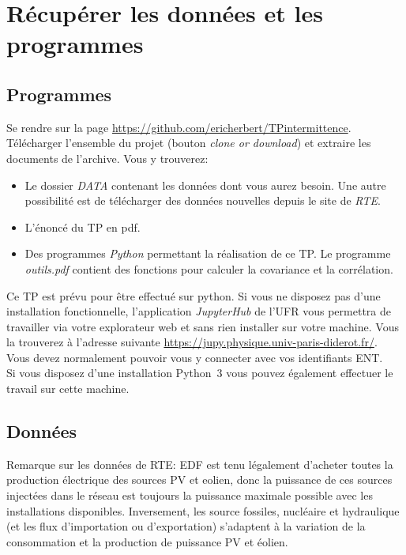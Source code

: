 \documentclass[12pt,a4,french]{article}
\newcommand{\tmtextit}[1]{{\itshape{#1}}}
\begin{document}
\section{Récupérer les données et les programmes}

\subsection{Programmes}

Se rendre sur la page
\href{https://github.com/ericherbert/TPintermittence}{https://github.com/ericherbert/TPintermittence}. Télécharger l'ensemble du projet (bouton \tmtextit{clone or download}) et extraire les documents de l'archive. Vous y trouverez:
\begin{itemize}
  \item Le dossier \tmtextit{DATA} contenant les données dont vous aurez besoin. Une autre possibilité est de télécharger des données nouvelles depuis le site de \tmtextit{RTE}.
  
  \item L'énoncé du TP en pdf.
  
  \item Des programmes \tmtextit{Python} permettant la réalisation de ce TP. Le programme \textit{outils.pdf} contient des fonctions pour calculer la covariance et la corrélation.
\end{itemize}

Ce TP est prévu pour être effectué sur python. Si vous ne disposez pas d'une installation fonctionnelle, l'application \tmtextit{JupyterHub} de l'UFR vous permettra de travailler via votre explorateur web et sans rien installer sur votre machine. Vous la trouverez à l'adresse suivante
\href{https://jupy.physique.univ-paris-diderot.fr/}{https://jupy.physique.univ-paris-diderot.fr/}. Vous devez normalement pouvoir vous y connecter avec vos identifiants ENT.\\
Si vous disposez d'une installation Python~3 vous pouvez également effectuer le travail sur cette machine.


\subsection{Données} \label{donnees}

Remarque sur les données de RTE: EDF est tenu légalement d'acheter toutes la
production électrique des sources PV et eolien, donc la puissance de ces sources injectées dans le réseau est toujours la puissance maximale possible avec les installations disponibles. Inversement, les source fossiles, nucléaire et hydraulique (et les flux d'importation ou d'exportation) s'adaptent à la variation de la consommation et la production de puissance PV et éolien.
\end{document}
